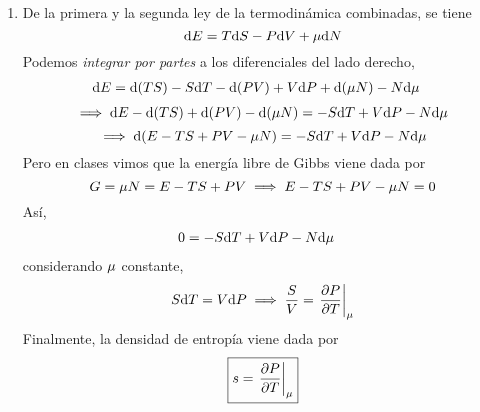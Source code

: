 \begin{sol}
\begin{enumerate}
\item 
De la primera y la segunda ley de la termodinámica combinadas, se tiene
\begin{equation}
  \dd E=T\dd S-P\dd V+\mu \dd N
\end{equation}
Podemos \textit{integrar por partes} a los diferenciales del lado derecho,
\begin{align}
  \dd E&=\dd (TS)-S\dd T-\dd(PV)+V\dd P+\dd(\mu N)-N\dd\mu
\end{align}
\begin{equation}
  \implies \dd E-\dd (TS)+\dd(PV)-\dd (\mu N)=-S\dd T+V\dd P-N\dd\mu 
\end{equation}
\begin{equation}
  \implies \dd (E-TS+PV-\mu N)=-S\dd T+V\dd P-N\dd\mu 
\end{equation}
Pero en clases vimos que la energía libre de Gibbs viene dada por
\begin{equation}
  G=\mu N=E-TS+PV\implies E-TS+PV-\mu N=0
\end{equation}
Así,
\begin{align}
  0&=-S\dd T+V\dd P-N\dd\mu 
\end{align}
considerando $\mu$ constante,
\begin{equation}
  S\dd T=V\dd P\implies \frac{S}{V}=\eval{\pdv{P}{T}}_\m 
\end{equation}
Finalmente, la densidad de entropía viene dada por
\begin{equation}
  \boxed{s=\eval{\pdv{P}{T}}_\m }
\end{equation}






























\end{enumerate}
\end{sol}